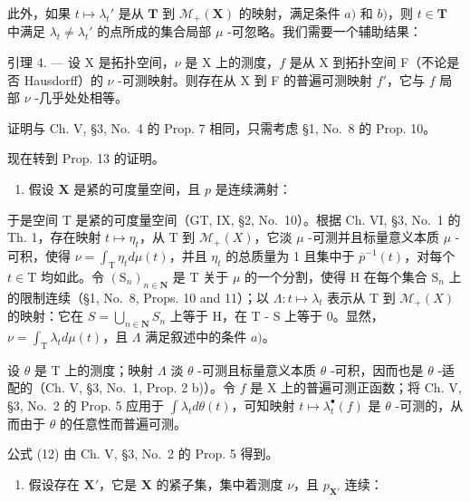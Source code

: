 此外，如果 \(t \mapsto \lambda_t'\) 是从 \(\mathbf{T}\) 到 \(\mathcal{M}_+(\mathbf{X})\) 的映射，满足条件 \(a)\) 和 \(b)\)，则 \(t \in \mathbf{T}\) 中满足 \(\lambda_t \neq \lambda_t'\) 的点所成的集合局部 \(\mu\) -可忽略。我们需要一个辅助结果：

引理 4. --- 设 X 是拓扑空间，\(\nu\) 是 X 上的测度，\(f\) 是从 X 到拓扑空间 F（不论是否 Hausdorff）的 \(\nu\) -可测映射。则存在从 X 到 F 的普遍可测映射 \(f'\)，它与 \(f\) 局部 \(\nu\) -几乎处处相等。

证明与 Ch. V, §3, No.~4 的 Prop. 7 相同，只需考虑 §1, No.~8 的 Prop. 10。

现在转到 Prop. 13 的证明。

\begin{enumerate}
\def\labelenumi{\Alph{enumi})}
\tightlist
\item
  假设 \(\mathbf{X}\) 是紧的可度量空间，且 \(p\) 是连续满射：
\end{enumerate}

于是空间 T 是紧的可度量空间（GT, IX, §2, No.~10）。根据 Ch. VI, §3, No.~1 的 Th. 1，存在映射 \(t \mapsto \eta_t\)，从 T 到 \(\mathcal{M}_+(X)\)，它淡 \(\mu\) -可测并且标量意义本质 \(\mu\) -可积，使得 \(\nu = \int_{\mathrm{T}} \eta_t d\mu(t)\)，并且 \(\eta_t\) 的总质量为 1 且集中于 \(\overline{p}^{-1}(t)\)，对每个 \(t \in \mathrm{T}\) 均如此。令 \((\mathrm{S}_n)_{n \in \mathbf{N}}\) 是 T 关于 \(\mu\) 的一个分割，使得 H 在每个集合 \(\mathrm{S}_n\) 上的限制连续（§1, No.~8, Props. 10 and 11）；以 \(\Lambda: t \mapsto \lambda_t\) 表示从 T 到 \(\mathcal{M}_+(X)\) 的映射：它在 \(S = \bigcup_{n \in \mathbf{N}} S_n\) 上等于 H，在 T - S 上等于 0。显然，\(\nu = \int_{\mathrm{T}}\lambda_t d\mu (t)\)，且 \(\Lambda\) 满足叙述中的条件 \(a)\)。

设 \(\theta\) 是 T 上的测度；映射 \(\Lambda\) 淡 \(\theta\) -可测且标量意义本质 \(\theta\) -可积，因而也是 \(\theta\) -适配的（Ch. V, §3, No.~1, Prop. 2 b)）。令 \(f\) 是 X 上的普遍可测正函数；将 Ch. V, §3, No.~2 的 Prop. 5 应用于 \(\int \lambda_t d\theta(t)\)，可知映射 \(t \mapsto \lambda_t^{\bullet}(f)\) 是 \(\theta\) -可测的，从而由于 \(\theta\) 的任意性而普遍可测。

公式 (12) 由 Ch. V, §3, No.~2 的 Prop. 5 得到。

\begin{enumerate}
\def\labelenumi{\Alph{enumi})}
\setcounter{enumi}{1}
\tightlist
\item
  假设存在 \(\mathbf{X}'\)，它是 \(\mathbf{X}\) 的紧子集，集中着测度 \(\nu\)，且 \(p_{\mathbf{X}'}\) 连续：
\end{enumerate}

